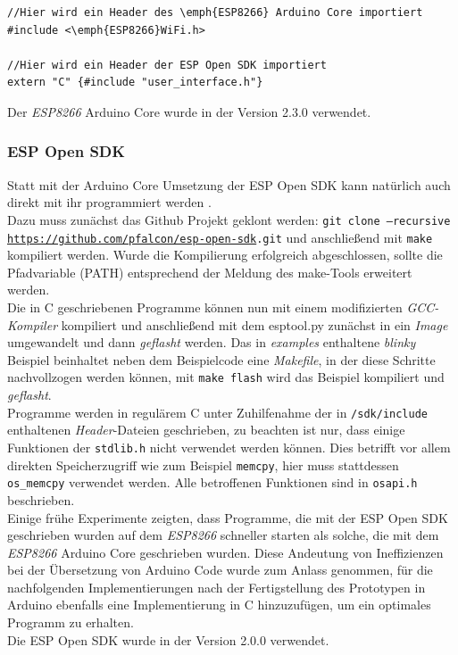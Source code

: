 \begin{verbatim}
//Hier wird ein Header des \emph{ESP8266} Arduino Core importiert
#include <\emph{ESP8266}WiFi.h> 

//Hier wird ein Header der ESP Open SDK importiert
extern "C" {#include "user_interface.h"} 
\end{verbatim}

Der \emph{ESP8266} Arduino Core wurde in der Version 2.3.0 verwendet.

\subsubsection{ESP Open SDK}
Statt mit der Arduino Core Umsetzung der ESP Open SDK kann natürlich auch direkt mit ihr programmiert werden \cite{esp2017open}. \\
Dazu muss zunächst das Github Projekt geklont werden: \texttt{git clone --recursive \url{https://github.com/pfalcon/esp-open-sdk}.git} und anschließend mit \texttt{make} kompiliert werden.
Wurde die Kompilierung erfolgreich abgeschlossen, sollte die Pfadvariable (PATH) entsprechend der Meldung des make-Tools erweitert werden. \\
Die in C geschriebenen Programme können nun mit einem modifizierten \emph{GCC-Kompiler} kompiliert und anschließend mit dem esptool.py zunächst in ein \emph{Image} umgewandelt und dann \emph{geflasht} werden. 
Das in \textit{examples} enthaltene \textit{blinky} Beispiel beinhaltet neben dem Beispielcode eine \emph{Makefile}, in der diese Schritte nachvollzogen werden können, mit \texttt{make flash} wird das Beispiel kompiliert und \emph{geflasht}. \\
Programme werden in regulärem C unter Zuhilfenahme der in \texttt{/sdk/include} enthaltenen \emph{Header}-Dateien geschrieben, zu beachten ist nur, dass einige Funktionen der \texttt{stdlib.h} nicht verwendet werden können.
Dies betrifft vor allem direkten Speicherzugriff wie zum Beispiel \texttt{memcpy}, hier muss stattdessen \texttt{os\_memcpy} verwendet werden.
Alle betroffenen Funktionen sind in \texttt{osapi.h} beschrieben. \\
Einige frühe Experimente zeigten, dass Programme, die mit der ESP Open SDK geschrieben wurden auf dem \emph{ESP8266} schneller starten als solche, die mit dem \emph{ESP8266} Arduino Core geschrieben wurden.
Diese Andeutung von Ineffizienzen bei der Übersetzung von Arduino Code wurde zum Anlass genommen, für die nachfolgenden Implementierungen nach der Fertigstellung des Prototypen in Arduino ebenfalls eine Implementierung in C hinzuzufügen, um ein optimales Programm zu erhalten. \\
Die ESP Open SDK wurde in der Version 2.0.0 verwendet.

